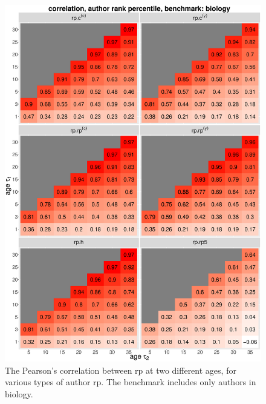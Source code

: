 \begin{figure}[ht!]
    \centering
    \includegraphics[width=\textwidth]{figures/pred_power/autrp/heatmap_cor_bio.eps}
    \caption{The Pearson's correlation between rp at two different ages, for various types of author rp. The benchmark includes only authors in biology.}
    \label{fig:hm_autrp_biology}
\end{figure}

